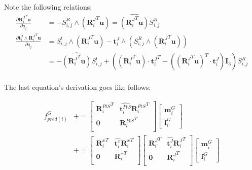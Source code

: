 Note the following relations:
\begin{align}
  \frac{\partial {\mathbf{R}_i^J}^T \mathbf{u}}{\partial q_j}
  &= - S^R_{i,j} \wedge ({\mathbf{R}_i^J}^T \mathbf{u})
  = \widehat{({\mathbf{R}_i^J}^T \mathbf{u})} S^R_{i,j}
  \\
  \frac{\partial\mathbf{t}^J_i\wedge {\mathbf{R}_i^J}^T  \mathbf{u}}{\partial q_j}
  &= S^t_{i,j} \wedge \left({\mathbf{R}_i^J}^T \mathbf{u}\right)
  - \mathbf{t}^J_i \wedge \left( S^R_{i,j} \wedge \left({\mathbf{R}_i^J}^T \mathbf{u}\right)\right) \\
  &= -\widehat{({\mathbf{R}_i^J}^T \mathbf{u})} S^t_{i,j}
  + \left(\left({\mathbf{R}_i^J}^T \mathbf{u}\right) \cdot {\mathbf{t}^J_i}^T
  - \left( {({\mathbf{R}_i^J}^T \mathbf{u})}^T \cdot \mathbf{t}^J_i\right) \mathbf{I}_3\right)S_{i,j}^R\\
\end{align}

The last equation's derivation goes like follows:

\begin{align}
  f^G_{pred(i)} & +=
  \begin{bmatrix}
    {\mathbf{R}^{PtS}_i}^T & \widehat{\mathbf{t}^{PtS}_i}{\mathbf{R}^{PtS}_i}^T \\
    \mathbf{0} & {\mathbf{R}^{PtS}_i}^T \\
  \end{bmatrix}
  \begin{bmatrix}
    \mathbf{m}^{G}_i \\ \mathbf{f}^{G}_i
  \end{bmatrix}
  \\
  & += \begin{bmatrix}
    {\mathbf{R}^{x}_i}^T & \widehat{\mathbf{t}^{x}_i}{\mathbf{R}^{x}_i}^T \\
    \mathbf{0} & {\mathbf{R}^{x}_i}^T \\
  \end{bmatrix}
  \begin{bmatrix}
    {\mathbf{R}^{J}_i}^T & \widehat{\mathbf{t}^{J}_i}{\mathbf{R}^{J}_i}^T \\
    \mathbf{0} & {\mathbf{R}^{J}_i}^T \\
  \end{bmatrix}
  \begin{bmatrix}
    \mathbf{m}^{G}_i \\ \mathbf{f}^{G}_i
  \end{bmatrix}
  \\
\end{align}

